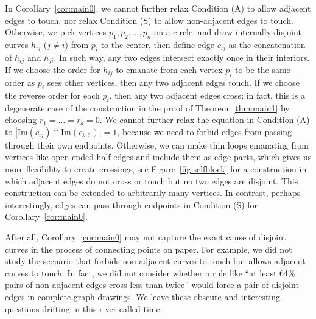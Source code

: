 \documentclass[a4paper,UKenglish,cleveref, autoref, thm-restate]{lipics_arxiv}
\begin{document}
In Corollary~\ref{cor:main0}, we cannot further relax Condition (A) to allow adjacent edges to touch, nor relax Condition (S) to allow non-adjacent edges to touch. Otherwise, we pick vertices $p_1,p_2,\dots,p_n$ on a circle, and draw internally disjoint curves $h_{ij}$ ($j\neq i$) from $p_i$ to the center, then define edge $c_{ij}$ as the concatenation of $h_{ij}$ and $h_{ji}$. In such way, any two edges intersect exactly once in their interiors. If we choose the order for $h_{ij}$ to emanate from each vertex $p_i$ to be the same order as $p_i$ sees other vertices, then any two adjacent edges touch. If we choose the reverse order for each $p_i$, then any two adjacent edges cross; in fact, this is a degenerate case of the construction in the proof of Theorem~\ref{thm:main1} by choosing $r_1 = \dots = r_d = 0$. We cannot further relax the equation in Condition (A) to $|\text{Im}(c_{ij}) \cap \text{Im}(c_{k\ell})| = 1$, because we need to forbid edges from passing through their own endpoints. Otherwise, we can make thin loops emanating from vertices like open-ended half-edges and include them as edge parts, which gives us more flexibility to create crossings, see Figure~\ref{fig:selfblock} for a construction in which adjacent edges do not cross or touch but no two edges are disjoint. This construction can be extended to arbitrarily many vertices. In contrast, perhaps interestingly, edges can pass through endpoints in Condition (S) for Corollary~\ref{cor:main0}.

After all, Corollary~\ref{cor:main0} may not capture the exact cause of disjoint curves in the process of connecting points on paper. For example, we did not study the scenario that forbids non-adjacent curves to touch but allows adjacent curves to touch. In fact, we did not consider whether a rule like ``at least 64\% pairs of non-adjacent edges cross less than twice'' would force a pair of disjoint edges in complete graph drawings. We leave these obscure and interesting questions drifting in this river called time.

\nocite{aichholzer2024twisted_conference2022,bergold2024holes_conference,bergold2025plane_conference2024,fox2025structure_conference2024,pach2003unavoidable_conference2000,pach1994some_conference1993,pach2010disjoint_conference2003,sharir2013counting_conference2012,suk2013disjoint_conference2012,suk2025unavoidable_conference2022,felsner2020maximum_conference}



\iffalse
\appendix
\end{document}
